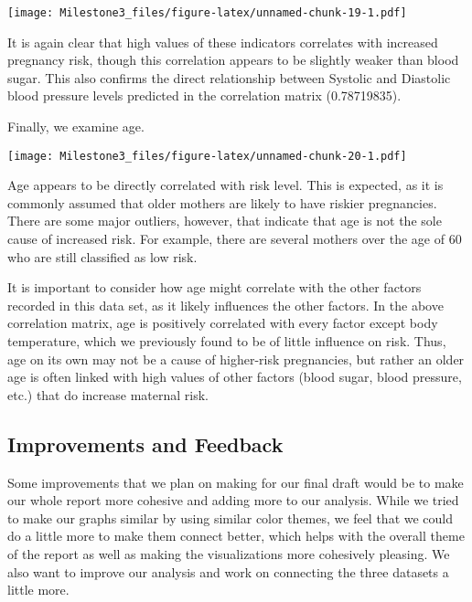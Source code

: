 \documentclass[
]{article}
\begin{document}
\bigskip

\texttt{[image: Milestone3\_files/figure-latex/unnamed-chunk-19-1.pdf]}

\bigskip

It is again clear that high values of these indicators correlates with
increased pregnancy risk, though this correlation appears to be slightly
weaker than blood sugar. This also confirms the direct relationship
between Systolic and Diastolic blood pressure levels predicted in the
correlation matrix (0.78719835).

Finally, we examine age.

\bigskip

\texttt{[image: Milestone3\_files/figure-latex/unnamed-chunk-20-1.pdf]}

\bigskip

Age appears to be directly correlated with risk level. This is expected,
as it is commonly assumed that older mothers are likely to have riskier
pregnancies. There are some major outliers, however, that indicate that
age is not the sole cause of increased risk. For example, there are
several mothers over the age of 60 who are still classified as low risk.

It is important to consider how age might correlate with the other
factors recorded in this data set, as it likely influences the other
factors. In the above correlation matrix, age is positively correlated
with every factor except body temperature, which we previously found to
be of little influence on risk. Thus, age on its own may not be a cause
of higher-risk pregnancies, but rather an older age is often linked with
high values of other factors (blood sugar, blood pressure, etc.) that do
increase maternal risk.

\hypertarget{improvements-and-feedback}{%
\subsection{Improvements and Feedback}\label{improvements-and-feedback}}

Some improvements that we plan on making for our final draft would be to
make our whole report more cohesive and adding more to our analysis.
While we tried to make our graphs similar by using similar color themes,
we feel that we could do a little more to make them connect better,
which helps with the overall theme of the report as well as making the
visualizations more cohesively pleasing. We also want to improve our
analysis and work on connecting the three datasets a little more.
\end{document}
